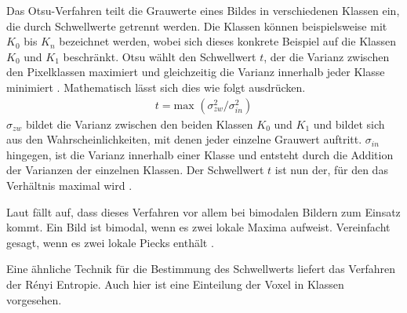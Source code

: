 Das Otsu-Verfahren teilt die Grauwerte eines Bildes in verschiedenen Klassen ein,
die durch Schwellwerte getrennt werden. Die Klassen können beispielsweise mit
$K_{0}$ bis $K_{n}$ bezeichnet werden, wobei sich dieses konkrete Beispiel auf die
Klassen $K_{0}$ und $K_{1}$ beschränkt. Otsu wählt den Schwellwert $t$, der die Varianz
zwischen den Pixelklassen maximiert und gleichzeitig die Varianz innerhalb jeder
Klasse minimiert \citep[vgl.][S.~264]{lehmann2013bildverarbeitung}. Mathematisch
lässt sich dies wie folgt ausdrücken.
\begin{align}
	t = \text{max }(\sigma_{zw}^{2}/ \sigma_{in}^{2})
\end{align}
$\sigma_{zw}$ bildet die Varianz zwischen den beiden Klassen $K_{0}$ und $K_{1}$
und bildet sich aus den Wahrscheinlichkeiten, mit denen jeder einzelne Grauwert auftritt.
$\sigma_{in}$ hingegen, ist die Varianz innerhalb einer Klasse und entsteht durch
die Addition der Varianzen der einzelnen Klassen. Der Schwellwert $t$ ist nun
der, für den das Verhältnis maximal wird \citep[vgl.][S.~264]{lehmann2013bildverarbeitung}.

Laut \citet[S.~264]{lehmann2013bildverarbeitung} fällt auf, dass dieses
Verfahren vor allem bei bimodalen Bildern zum Einsatz kommt. Ein Bild ist bimodal,
wenn es zwei lokale Maxima aufweist. Vereinfacht gesagt, wenn es zwei lokale
Piecks enthält \citep[vgl.][S.~264]{lehmann2013bildverarbeitung}.

Eine ähnliche Technik für die Bestimmung des Schwellwerts liefert das Verfahren der
Rényi Entropie. Auch hier ist eine Einteilung der Voxel in Klassen vorgesehen.

\pagebreak

